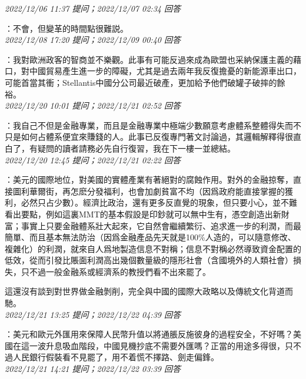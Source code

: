 \documentclass[twocolumn]{ctexart}
\begin{document}
\textit{\hfill\noindent\small 2022/12/06 11:37 提问；2022/12/07 02:34 回答}

：不會，但變革的時間點很難説。
\\

\textit{\hfill\noindent\small 2022/12/08 17:20 提问；2022/12/09 00:40 回答}

：我對歐洲政客的智商並不樂觀。此事有可能反過來成為歐盟也采納保護主義的藉口，對中國貿易產生進一步的障礙，尤其是過去兩年我反復擔憂的新能源車出口，可能首當其衝；Stellantis中國分公司最近破產，更加給予他們破罐子破摔的餘裕。
\\

\textit{\hfill\noindent\small 2022/12/20 10:01 提问；2022/12/21 02:52 回答}

：我自己不但是金融專業，而且是金融專業中極端少數願意考慮體系整體得失而不只是如何占體系便宜來賺錢的人。此事已反復專門著文討論過，其邏輯解釋得很直白了，有疑問的讀者請務必先自行復習，我在下一樓一並總結。
\\

\textit{\hfill\noindent\small 2022/12/20 12:45 提问；2022/12/21 02:22 回答}

：美元的國際地位，對美國的實體產業有著絕對的腐蝕作用。對外的金融掠奪，直接圖利華爾街，再怎麽分發福利，也會加劇貧富不均（因爲政府能直接掌握的獲利，必然只占少數）。經濟比政治，還有更多反直覺的現象，但只要小心，並不難看出要點，例如這裏MMT的基本假設是印鈔就可以無中生有，憑空創造出新財富；事實上只要金融體系壯大起來，它自然會繼續繁衍、追求進一步的利潤，而最簡單、而且基本無法防治（因爲金融產品先天就是100\%人造的，可以隨意修改、複雜化）的利潤，就來自人爲地製造信息不對稱；信息不對稱必然導致資金配置的低效，從而引發比賬面利潤高出幾個數量級的隱形社會（含國境外的人類社會）損失，只不過一般金融系或經濟系的教授們看不出來罷了。

這還沒有談到對世界做金融剝削，完全與中國的國際大政略以及傳統文化背道而馳。
\\

\textit{\hfill\noindent\small 2022/12/21 13:25 提问；2022/12/22 04:39 回答}

：美元和歐元外匯用來保障人民幣升值以將通脹反施彼身的過程安全，不好嗎？美國在這一波升息吸血階段，中國見機抄底不需要外匯嗎？正當的用途多得很，只不過人民銀行假裝看不見罷了，用不着慌不擇路、劍走偏鋒。
\\

\textit{\hfill\noindent\small 2022/12/21 14:21 提问；2022/12/22 03:39 回答}
\end{document}
